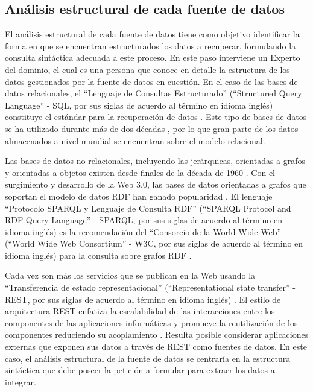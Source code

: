 \subsection{Análisis estructural de cada fuente de datos}

El análisis estructural de cada fuente de datos tiene como objetivo identificar la forma en que se encuentran estructurados los datos a recuperar, formulando la consulta sintáctica adecuada a este proceso. En este paso interviene un Experto del dominio, el cual es una persona que conoce en detalle la estructura de los datos gestionados por la fuente de datos en cuestión. En el caso de las bases de datos relacionales, el ``Lenguaje de Consultas Estructurado'' (``Structured Query Language'' - SQL, por sus siglas de acuerdo al término en idioma inglés) constituye el estándar para la recuperación de datos \citep{Eisenberg:1999:SFK:309844.310075}. Este tipo de bases de datos se ha utilizado durante más de dos décadas \citep{BUCKLES1993660,Hristidis2002670,10.1007/978-981-10-8276-4_22}, por lo que gran parte de los datos almacenados a nivel mundial se encuentran sobre el modelo relacional.

Las bases de datos no relacionales, incluyendo las jerárquicas, orientadas a grafos y orientadas a objetos existen desde finales de la década de 1960 \citep{Leavitt2010}. Con el surgimiento y desarrollo de la Web 3.0, las bases de datos orientadas a grafos que soportan el modelo de datos RDF han ganado popularidad \citep{Zaki2017,BRISABOA2017106}. El lenguaje ``Protocolo SPARQL y Lenguaje de Consulta RDF'' (``SPARQL Protocol and RDF Query Language'' - SPARQL, por sus siglas de acuerdo al término en idioma inglés) es la recomendación del ``Consorcio de la World Wide Web'' (``World Wide Web Consortium'' - W3C, por sus siglas de acuerdo al término en idioma inglés) para la consulta sobre grafos RDF \citep{W3CSPARQLWorkingGroup2013}.

Cada vez son más los servicios que se publican en la Web usando la ``Transferencia de estado representacional'' (``Representational state transfer'' - REST, por sus siglas de acuerdo al término en idioma inglés) \citep{Pautasso2014}. El estilo de arquitectura REST enfatiza la escalabilidad de las interacciones entre los componentes de las aplicaciones informáticas y promueve la reutilización de los componentes reduciendo su acoplamiento \citep{Pautasso2014}. Resulta posible considerar aplicaciones externas que exponen sus datos a través de REST como fuentes de datos. En este caso, el análisis estructural de la fuente de datos se centraría en la estructura sintáctica que debe poseer la petición a formular para extraer los datos a integrar.

